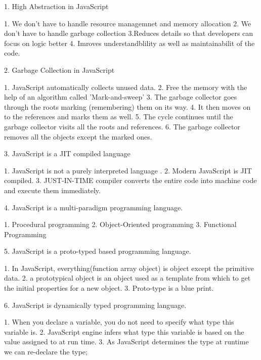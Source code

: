 
1. High Abstraction in JavaScript

    1. We don't have to handle resource managemnet and memory allocation
    2. We don't have to handle garbage collection
    3.Reduces details so that developers can focus on logic better
    4. Imroves understandblility as well as maintainabilit of the code. 

2. Garbage Collection in JavaScript

    1. JavaScript automatically collects unused data. 
    2. Free the memory with the help of an algorithm called 'Mark-and-sweep'
    3. The garbage collector goes through the roots marking (remembering) them on its way. 
    4. It then moves on to the references and marks them as well. 
    5. The cycle continues until the garbage collector visits all the roots and references. 
    6. The garbage collector removes all the objects except the marked ones.

3. JavaScript is a JIT compiled language

    1.  JavaScript is not a purely interpreted language .
    2. Modern JavaScript is JIT compiled. 
    3. JUST-IN-TIME compiler converts the entire code into machine code and execute them immediately. 

4. JavaScript is a multi-paradigm programming language.

    1. Procedural programming
    2. Object-Oriented programming
    3. Functional Programming 

5. JavaScript is a proto-typed based programming language.

    1. In JavaScript, everything(function array object) is object except the primitive data.
    2. a prototypical object is an object used as a template from which to get the initial properties for a new object.
    3. Proto-type is a blue print.

6. JavaScript is dynamically typed programming language.

    1. When you declare a variable, you do not need to specify what type this variable is. 
    2. JavaScript engine infers what type this variable is based on the value assigned to at run time.
    3. As JavaScript determines the type at runtime we can re-declare the type;